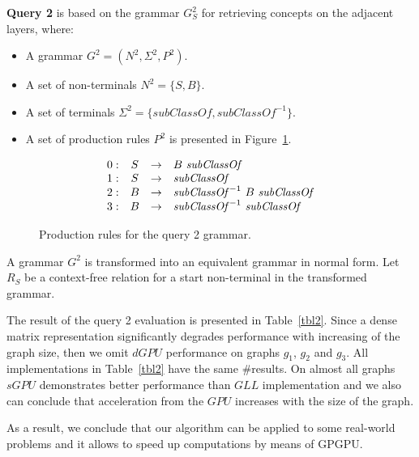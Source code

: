 \textbf{Query 2} is based on the grammar $G^2_S$ for retrieving concepts on the adjacent layers, where:
\begin{itemize}
    \item A grammar $G^2 = (N^2, \Sigma^2, P^2)$.
    \item A set of non-terminals $N^2 = \{S, B\}$.
    \item A set of terminals $\Sigma^2 = \{subClassOf, subClassOf^{-1}\}$.
    \item A set of production rules $P^2$ is presented in Figure~\ref{ProductionRulesQuery2}.
\end{itemize}

\begin{figure}[h]
   \[
\begin{array}{rccl}
   0: & S & \rightarrow & B \ \text{\textit{subClassOf}} \\ 
   1: & S & \rightarrow & \text{\textit{subClassOf}} \\ 
   2: & B & \rightarrow & \text{\textit{subClassOf}}^{-1} \ B \ \text{\textit{subClassOf}} \\ 
   3: & B & \rightarrow & \text{\textit{subClassOf}}^{-1} \ \text{\textit{subClassOf}} \\ 
\end{array}
\]
\caption{Production rules for the query 2 grammar.}
\label{ProductionRulesQuery2}
\end{figure}

A grammar $G^2$ is transformed into an equivalent grammar in normal form. Let $R_S$ be a context-free relation for a start non-terminal in the transformed grammar.

The result of the query 2 evaluation is presented in Table~\ref{tbl2}. Since a dense matrix representation significantly degrades performance with increasing of the graph size, then we omit $dGPU$ performance on graphs $g_1$, $g_2$ and $g_3$. All implementations in Table~\ref{tbl2} have the same \#results. On almost all graphs $sGPU$ demonstrates better performance than $GLL$ implementation and we also can conclude that acceleration from the $GPU$ increases with the size of the graph.

As a result, we conclude that our algorithm can be applied to some real-world problems and it allows to speed up computations by means of GPGPU.

